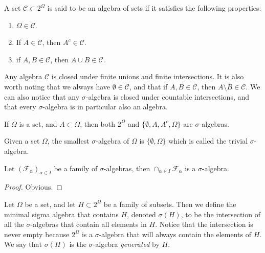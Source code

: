 \documentclass[11pt,a4paper]{article}
\begin{document}
\begin{definition}
  A set $\mathcal C \subset 2^\Omega$ is said to be an algebra of sets if it 
  satisfies the following properties:
  \begin{enumerate}
    \item[(1)] $\Omega \in \mathcal C$.
    \item[(2)] If $A \in \mathcal C$, then $A^c \in \mathcal C$.
    \item[(3)] if $A,B \in \mathcal C$, then $A \cup B \in \mathcal C$.
  \end{enumerate}
\end{definition}

\begin{remark}
  Any algebra $\mathcal C$ is closed under
  finite unions and finite intersections.
  It is also worth noting that we always have
  $\emptyset \in \mathcal C$, and that if $A,B \in \mathcal C$, then
  $A \setminus B \in \mathcal C$.
  We can also notice that any $\sigma$-algebra is closed under countable
  intersections,
  and that every $\sigma$-algebra is in particular also an algebra.
\end{remark}

\begin{example}
  If $\Omega$ is a set, and $A \subset \Omega$, then both $2^\Omega$ and 
  $\{\emptyset, A, A^c, \Omega\}$ are $\sigma$-algebras.
\end{example}

\begin{example}
  Given a set $\Omega$, the smallest $\sigma$-algebra of $\Omega$ is
  $\{\emptyset, \Omega\}$ which is called the trivial $\sigma$-algebra.
\end{example}

\begin{proposition}
  Let $(\mathcal F_\alpha)_{\alpha \in I}$ be a family of $\sigma$-algebras,
  then $\cap_{\alpha \in I}{\mathcal F_\alpha}$ is a $\sigma$-algebra.
\end{proposition}
\begin{proof}
  Obvious.
\end{proof}

\begin{definition}
  Let $\Omega$ be a set, and let $H \subset 2^\Omega$ be a family of
  subsets. Then we define the minimal sigma algebra that contains $H$,
  denoted $\sigma(H)$, to be the intersection of all the $\sigma$-algebras
  that contain all elements in $H$. Notice that the intersection is
  never empty because $2^\Omega$ is a $\sigma$-algebra that will always
  contain the elements of $H$.
  We say that $\sigma(H)$ is the $\sigma$-algebra \textit{generated} by $H$.
\end{definition}
\end{document}

